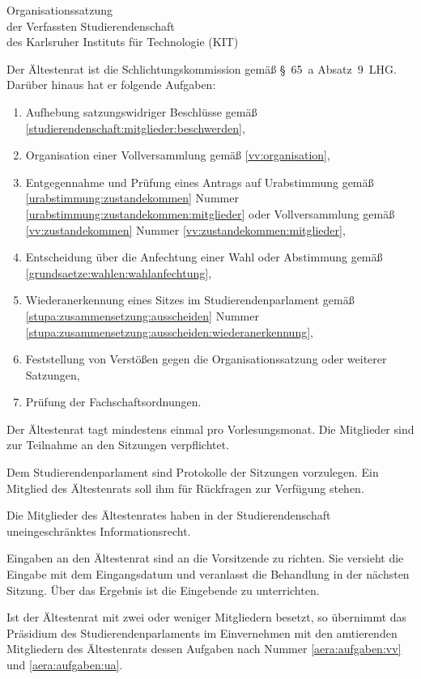 \begin{jurdoc}[Organisationssatzung]{Organisationssatzung\\der Verfassten Studierendenschaft\\des Karlsruher Instituts für Technologie (KIT)}
%
%


\label{aera:aufgaben}

Der Ältestenrat ist die Schlichtungskommission gemäß §~65~a Absatz~9~LHG. Darüber hinaus hat er folgende Aufgaben: \label{aera:aufgaben:allgemein}
  \begin{enumerate}
  \item Aufhebung satzungswidriger Beschlüsse gemäß \ref{studierendenschaft:mitglieder:beschwerden},
  \item \label{aera:aufgaben:vv} Organisation einer Vollversammlung gemäß \ref{vv:organisation},
  \item \label{aera:aufgaben:ua} Entgegennahme und Prüfung eines Antrags auf Urabstimmung  gemäß \ref{urabstimmung:zustandekommen} Nummer \ref{urabstimmung:zustandekommen:mitglieder} oder Vollversammlung gemäß \ref{vv:zustandekommen} Nummer \ref{vv:zustandekommen:mitglieder},
  \item Entscheidung über die Anfechtung einer Wahl oder Abstimmung gemäß \ref{grundsaetze:wahlen:wahlanfechtung},
  \item Wiederanerkennung eines Sitzes im Studierendenparlament  gemäß \ref{stupa:zusammensetzung:ausscheiden} Nummer \ref{stupa:zusammensetzung:ausscheiden:wiederanerkennung},
  \item Feststellung von Verstößen gegen die Organisationssatzung oder weiterer Satzungen,
  \item Prüfung der Fachschaftsordnungen.
  \end{enumerate}

Der Ältestenrat tagt mindestens einmal pro Vorlesungsmonat. Die Mitglieder sind zur Teilnahme an den Sitzungen verpflichtet.

Dem Studierendenparlament sind Protokolle der Sitzungen vorzulegen. Ein Mitglied des Ältestenrats soll ihm für Rückfragen zur Verfügung stehen.

Die Mitglieder des Ältestenrates haben in der Studierendenschaft uneingeschränktes Informationsrecht.

Eingaben an den Ältestenrat sind an die Vorsitzende zu richten. Sie versieht die Eingabe mit dem Eingangsdatum und veranlasst die Behandlung in der nächsten Sitzung. Über das Ergebnis ist die Eingebende zu unterrichten.

Ist der Ältestenrat mit zwei oder weniger Mitgliedern besetzt, so übernimmt das Präsidium des Studierendenparlaments im Einvernehmen mit den amtierenden Mitgliedern des Ältestenrats dessen Aufgaben nach  Nummer \ref{aera:aufgaben:vv} und \ref{aera:aufgaben:ua}.



\end{jurdoc}
